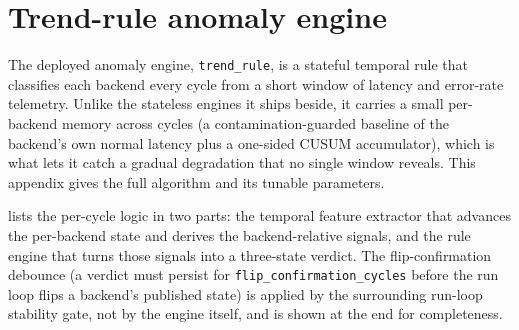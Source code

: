 \section{Trend-rule anomaly engine}\label{bm:alg:trend-rule}

The deployed anomaly engine, \texttt{trend\_rule}, is a stateful temporal rule
that classifies each backend every cycle from a short window of latency and
error-rate telemetry. Unlike the stateless engines it ships beside, it carries a
small per-backend memory across cycles (a contamination-guarded baseline of the
backend's own normal latency plus a one-sided CUSUM accumulator), which is what
lets it catch a gradual degradation that no single window reveals. This appendix
gives the full algorithm and its tunable parameters.

 lists the per-cycle logic in two parts: the temporal
feature extractor that advances the per-backend state and derives the
backend-relative signals, and the rule engine that turns those signals into a
three-state verdict. The flip-confirmation debounce (a verdict must persist for
\texttt{flip\_confirmation\_cycles} before the run loop flips a backend's
published state) is applied by the surrounding run-loop stability gate, not by
the engine itself, and is shown at the end for completeness.

